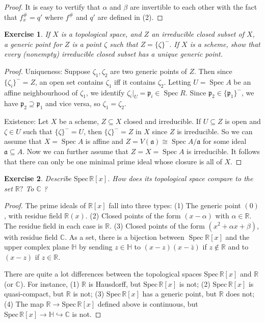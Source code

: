 \documentclass[12pt]{amsart}
\newtheorem{exe}{Exercise}[subsection]
\begin{document}
\begin{proof}
	It is easy to vertify that $\alpha$ and $\beta$ are invertible to each other with the fact that $f^\#_x=q'$ where $f^\#$ and $q'$ are defined in (2).
\end{proof}

\begin{exe}
If $X$ is a topological space, and $Z$ an irreducible closed subset of $X$, a generic point for $Z$ is a point $\zeta$ such that $Z=\{\zeta\}^{-} .$ If $X$ is a scheme, show that every (nonempty) irreducible closed subset has a unique generic point.
\end{exe}
\begin{proof}
Uniqueness: Suppose $\zeta_{1}, \zeta_{2}$ are two generic points of $Z$. Then since $\{\zeta_{i}\}^-=Z$, an open set contains $\zeta_{1}$ iff it contains $\zeta_{2}$. Letting $U=\operatorname{Spec} A$ be an affine neighbourhood of $\zeta_{1}$, we identify $\zeta_{i}|_U=\mathfrak{p}_{i} \in \operatorname{Spec} R$. Since $\mathfrak{p}_{2} \in \{\mathfrak{p}_{1}\}^-$, we have $\mathfrak{p}_{2} \supseteq \mathfrak{p}_{1}$ and vice versa, so $\zeta_{1}=\zeta_{2}$.

Existence: Let $X$ be a scheme, $Z \subseteq X$ closed and irreducible. If $U \subseteq Z$ is open and $\zeta \in U$ such that $\{\zeta\}^-=U$, then $\{\zeta\}^-=Z$ in $X$ since $Z$ is irreducible. So we can assume that $X=\operatorname{Spec} A$ is affine and $Z=V(\mathfrak{a})\cong\operatorname{Spec} A / \mathfrak{a}$ for some ideal $\mathfrak{a} \subseteq A .$ Now we can further assume that $Z=X=\operatorname{Spec} A$ is irreducible. It follows that there can only be one minimal prime ideal whose closure is all of $X$.
\end{proof}

\begin{exe}
Describe $\mathrm{Spec}\, \mathbb{R}[x]$. How does its topological space compare to the set $\mathbb{R} ?$ To $\mathbb{C}$ ?
\end{exe}

\begin{proof}
The prime ideals of $\mathbb{R}[x]$ fall into three types:
(1) The generic point $(0)$, with residue field $\mathbb{R}(x)$.
(2) Closed points of the form $(x-\alpha)$ with $\alpha \in \mathbb{R}$. The residue field in each case is $\mathbb{R}$.
(3) Closed points of the form $\left(x^{2}+\alpha x+\beta\right)$, with residue field $\mathbb{C}$.
As a set, there is a bijection between $\operatorname{Spec} \mathbb{R}[x]$ and the upper complex plane $\mathbb{H}$ by sending $z \in \mathbb{H}$ to $(x-z)(x-\bar{z})$ if $z \notin \mathbb{R}$ and
to $(x-z)$ if $z \in \mathbb{R}$.

There are quite a lot differences between the topological spaces $\mathrm{Spec}\,\mathbb{R}[x]$ and $\mathbb{R}$ (or $\mathbb{C}$). For instance, (1) $\mathbb{R}$ is Hausdorff, but $\mathrm{Spec}\,\mathbb{R}[x]$ is not; (2) $\mathrm{Spec}\,\mathbb{R}[x]$ is quasi-compact, but $\mathbb{R}$ is not; (3) $\mathrm{Spec}\,\mathbb{R}[x]$ has a generic point, but $\mathbb{R}$ does not;
(4) The map $\mathbb{R}\to\mathrm{Spec}\,\mathbb{R}[x]$ defined above is continuous, but $\mathrm{Spec}\,\mathbb{R}[x]\to\mathbb{H}\hookrightarrow\mathbb{C}$ is not.
\end{proof}
\end{document}

